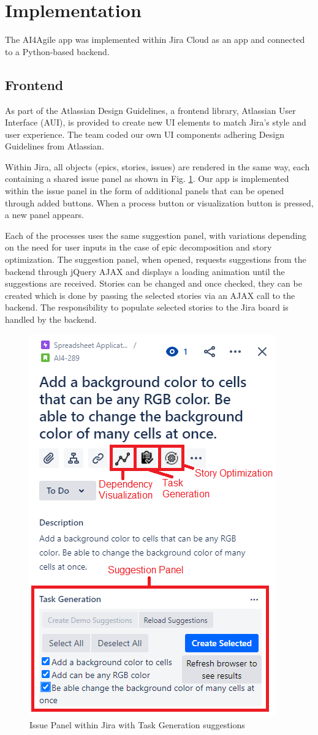 \section{Implementation}
\label{implementation}

The AI4Agile app was implemented within Jira Cloud as an app and connected to a Python-based backend.

\subsection{Frontend}

As part of the Atlassian Design Guidelines\cite{jira3}, a frontend library, Atlassian User Interface (AUI)\cite{jira4}, is provided to create new UI elements to match Jira’s style and user experience. The team coded our own UI components adhering Design Guidelines from Atlassian.

Within Jira, all objects (epics, stories, issues) are rendered in the same way, each containing a shared issue panel as shown in Fig. \ref{fig:issueView}. Our app is implemented within the issue panel in the form of additional panels that can be opened through added buttons. When a process button or visualization button is pressed, a new panel appears.

Each of the processes uses the same suggestion panel, with variations depending on the need for user inputs in the case of epic decomposition and story optimization. The suggestion panel, when opened, requests suggestions from the backend through jQuery AJAX\cite{ajax} and displays a loading animation until the suggestions are received. Stories can be changed and once checked, they can be created which is done by passing the selected stories via an AJAX call to the backend. The responsibility to populate selected stories to the Jira board is handled by the backend.

\begin{figure}
\centering
\includegraphics[width=.5\textwidth,keepaspectratio]{./figure/Frontend.png}
\caption{Issue Panel within Jira with Task Generation suggestions }
\label{fig:issueView}
\end{figure}

